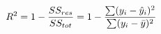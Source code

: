 \documentclass[preview]{standalone}
\begin{document}
\begin{align*}
\special{dvisvgm:raw <g id='unique000'>}R^2 = 1 - \frac{SS_{res}}{SS_{tot}}= 1 - \frac{\sum(y_i - \hat{y}_i)^2}{\sum(y_i - \bar{y})^2}\special{dvisvgm:raw </g>}
\end{align*}
\end{document}
